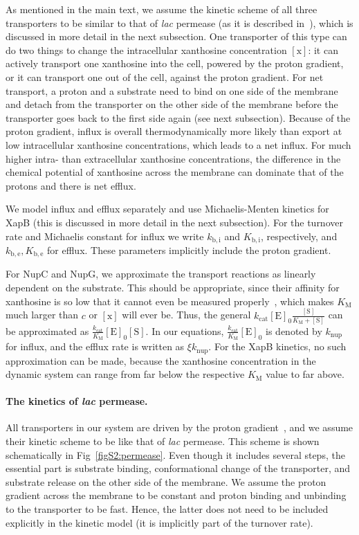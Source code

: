 \documentclass[10pt,letterpaper]{article}
\newcommand{\n}[1]{\mathrm{#1}}
\begin{document}
As mentioned in the main text, we assume the kinetic scheme of all three transporters to be similar to that
of \emph{lac} permease (as it is described in~\cite{Kaback2015}), which is discussed in more detail in the next subsection. One transporter of this type can do two things to change the intracellular xanthosine
concentration $\n{[x]}$: it can actively transport one xanthosine into the
cell, powered by the proton gradient, or it can transport one out of the
cell, against the proton gradient. For net transport, a proton and a
substrate need to bind on one side of the membrane and detach from the
transporter on the other side of the membrane before the transporter goes
back to the first side again (see next subsection). Because of the
proton gradient, influx is overall thermodynamically more likely than export
at low intracellular xanthosine concentrations, which leads to a net influx.
For much higher intra- than extracellular xanthosine concentrations, the
difference in the chemical potential of xanthosine across the membrane can
dominate that of the protons and there is net efflux. 

We model influx and efflux separately and use Michaelis-Menten kinetics for
XapB (this is discussed in more detail in the next subsection). For the turnover rate and Michaelis constant for influx we write
$k_{\n{b, i}}$ and $K_{\n{b, i}}$, respectively, and $k_{\n{b, e}}, K_{\n{b,
		e}}$ for efflux. These parameters implicitly include the proton gradient.

For NupC and NupG, we approximate the transport reactions as linearly dependent on the substrate. This should be appropriate, since their affinity for xanthosine is so low that it cannot even be measured properly~\cite{Norholm2001}, which makes $K_{\n{M}}$ much larger than $c$ or $\n{[x]}$ will ever be. Thus, the general $k_{\n{cat}} \n{[E]_0}
\frac{\n{[S]}}{K_{\n{M}} + \n{[S]}}$ can be approximated as
$\frac{k_{\n{cat}}}{K_{\n{M}}} \n{[E]_0} \n{[S]}$. In our equations,
$\frac{k_{\n{cat}}}{K_{\n{M}}} \n{[E]_0}$ is denoted by $k_{\n{nup}}$ for
influx, and the efflux rate is written as $\xi k_{\n{nup}}$. For the XapB
kinetics, no such approximation can be made, because the xanthosine
concentration in the dynamic system can range from far below the respective
$K_{\n{M}}$ value to far above.

\paragraph*{The kinetics of \emph{lac} permease.}
All transporters in our system are driven by the proton gradient~\cite{Norholm2001}, and we assume their kinetic scheme to be like that of \emph{lac} permease. This scheme is shown schematically in Fig~\ref{figS2:permease}.
Even though it includes several steps, the essential part is substrate binding, conformational change of the transporter, and substrate release on the other side of the membrane. We assume the proton gradient across the membrane to be constant and proton binding and unbinding to the transporter to be fast. Hence, the latter does not need to be included explicitly in the kinetic model (it is implicitly part of the turnover rate). 
\end{document}
